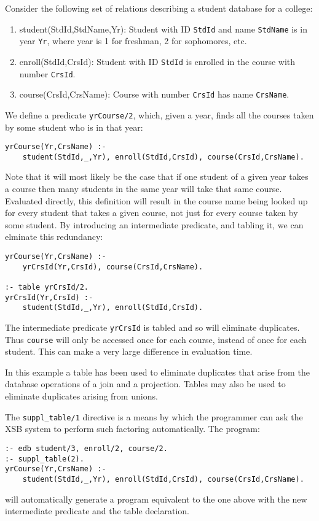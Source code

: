 \begin{example}{}\label{multi-join}
Consider the following set of relations describing a student database
for a college:
\begin{enumerate}
\item student(StdId,StdName,Yr):
  Student with ID \verb|StdId| and name \verb|StdName| is in year
  \verb|Yr|, where year is 1 for freshman, 2 for sophomores, etc.
\item enroll(StdId,CrsId):
  Student with ID \verb|StdId| is enrolled in the course with number
  \verb|CrsId|.
\item course(CrsId,CrsName):
  Course with number \verb|CrsId| has name \verb|CrsName|.
\end{enumerate}
We define a predicate \verb|yrCourse/2|, which, given a year,
finds all the courses taken by some student who is in that year:
\begin{verbatim}
yrCourse(Yr,CrsName) :- 
    student(StdId,_,Yr), enroll(StdId,CrsId), course(CrsId,CrsName).
\end{verbatim}
Note that it will most likely be the case that if one student of a
given year takes a course then many students in the same year will
take that same course.  Evaluated directly, this definition will result
in the course name being looked up for every student that takes a
given course, not just for every course taken by some student.  By
introducing an intermediate predicate, and tabling it, we can
elminate this redundancy:
\begin{verbatim}
yrCourse(Yr,CrsName) :- 
    yrCrsId(Yr,CrsId), course(CrsId,CrsName).

:- table yrCrsId/2.
yrCrsId(Yr,CrsId) :-
    student(StdId,_,Yr), enroll(StdId,CrsId).
\end{verbatim}
The intermediate predicate \verb|yrCrsId| is tabled and so will
eliminate duplicates.  Thus \verb|course| will only be accessed once
for each course, instead of once for each student.  This can make a
very large difference in evaluation time.
\end{example}

In this example a table has been used to eliminate duplicates that
arise from the database operations of a join and a projection.  Tables
may also be used to eliminate duplicates arising from unions.

The \verb|suppl_table/1| directive is a means by which the programmer
can ask the XSB system to perform such factoring automatically.  The
program:
\begin{verbatim}
:- edb student/3, enroll/2, course/2.
:- suppl_table(2).
yrCourse(Yr,CrsName) :- 
    student(StdId,_,Yr), enroll(StdId,CrsId), course(CrsId,CrsName).
\end{verbatim}
will automatically generate a program equivalent to the one above with
the new intermediate predicate and the table declaration.

